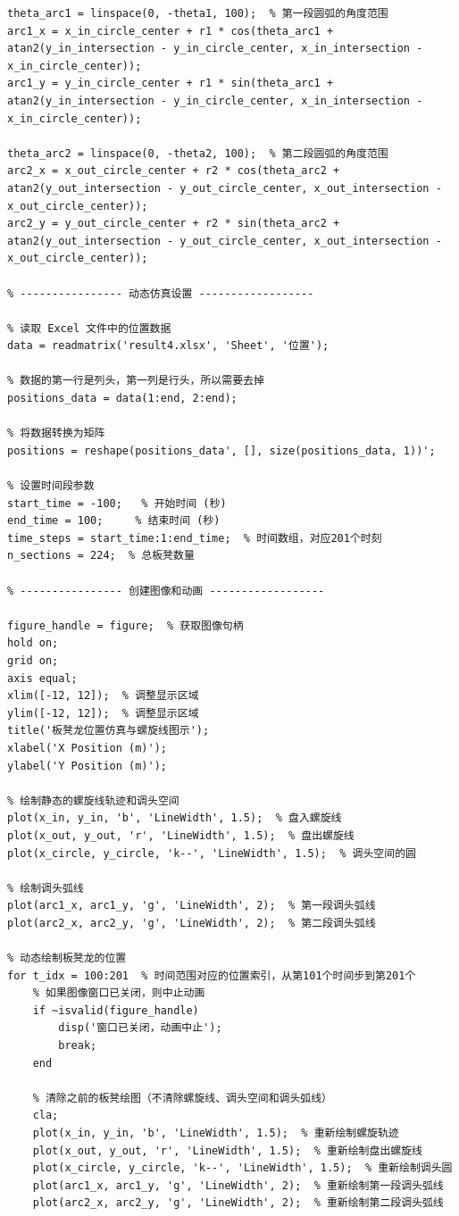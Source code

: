 \documentclass{cumcmthesis1}
\begin{document}
\begin{lstlisting}[caption={对问题4整个调头过程进行仿真模拟的代码}, label={lst:ninth_code}]
% 计算调头弧线
theta_arc1 = linspace(0, -theta1, 100);  % 第一段圆弧的角度范围
arc1_x = x_in_circle_center + r1 * cos(theta_arc1 + atan2(y_in_intersection - y_in_circle_center, x_in_intersection - x_in_circle_center));
arc1_y = y_in_circle_center + r1 * sin(theta_arc1 + atan2(y_in_intersection - y_in_circle_center, x_in_intersection - x_in_circle_center));

theta_arc2 = linspace(0, -theta2, 100);  % 第二段圆弧的角度范围
arc2_x = x_out_circle_center + r2 * cos(theta_arc2 + atan2(y_out_intersection - y_out_circle_center, x_out_intersection - x_out_circle_center));
arc2_y = y_out_circle_center + r2 * sin(theta_arc2 + atan2(y_out_intersection - y_out_circle_center, x_out_intersection - x_out_circle_center));

% ---------------- 动态仿真设置 ------------------

% 读取 Excel 文件中的位置数据
data = readmatrix('result4.xlsx', 'Sheet', '位置');

% 数据的第一行是列头，第一列是行头，所以需要去掉
positions_data = data(1:end, 2:end);

% 将数据转换为矩阵
positions = reshape(positions_data', [], size(positions_data, 1))';

% 设置时间段参数
start_time = -100;   % 开始时间 (秒)
end_time = 100;     % 结束时间 (秒)
time_steps = start_time:1:end_time;  % 时间数组，对应201个时刻
n_sections = 224;  % 总板凳数量

% ---------------- 创建图像和动画 ------------------

figure_handle = figure;  % 获取图像句柄
hold on;
grid on;
axis equal;
xlim([-12, 12]);  % 调整显示区域
ylim([-12, 12]);  % 调整显示区域
title('板凳龙位置仿真与螺旋线图示');
xlabel('X Position (m)');
ylabel('Y Position (m)');

% 绘制静态的螺旋线轨迹和调头空间
plot(x_in, y_in, 'b', 'LineWidth', 1.5);  % 盘入螺旋线
plot(x_out, y_out, 'r', 'LineWidth', 1.5);  % 盘出螺旋线
plot(x_circle, y_circle, 'k--', 'LineWidth', 1.5);  % 调头空间的圆

% 绘制调头弧线
plot(arc1_x, arc1_y, 'g', 'LineWidth', 2);  % 第一段调头弧线
plot(arc2_x, arc2_y, 'g', 'LineWidth', 2);  % 第二段调头弧线

% 动态绘制板凳龙的位置
for t_idx = 100:201  % 时间范围对应的位置索引，从第101个时间步到第201个
    % 如果图像窗口已关闭，则中止动画
    if ~isvalid(figure_handle)
        disp('窗口已关闭，动画中止');
        break;
    end
    
    % 清除之前的板凳绘图（不清除螺旋线、调头空间和调头弧线）
    cla;
    plot(x_in, y_in, 'b', 'LineWidth', 1.5);  % 重新绘制螺旋轨迹
    plot(x_out, y_out, 'r', 'LineWidth', 1.5);  % 重新绘制盘出螺旋线
    plot(x_circle, y_circle, 'k--', 'LineWidth', 1.5);  % 重新绘制调头圆
    plot(arc1_x, arc1_y, 'g', 'LineWidth', 2);  % 重新绘制第一段调头弧线
    plot(arc2_x, arc2_y, 'g', 'LineWidth', 2);  % 重新绘制第二段调头弧线


\end{lstlisting}
\end{document}
